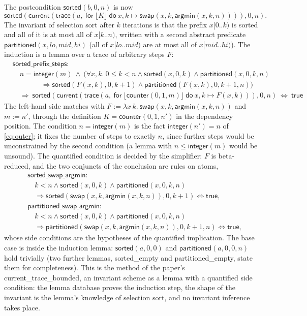 \documentclass[11pt,a4paper]{article}
\newcommand{\bl}[1]{\lfloor #1\rfloor}                       %
\newcommand{\tr}[3]{\mathsf{trace}(#1,\ \mathsf{for}\ #2\ \mathsf{do}\ #3)}
\newcommand{\cnt}{\mathsf{counter}}
\newcommand{\cur}{\mathsf{current}}
\newcommand{\intf}{\mathsf{integer}}
\newcommand{\sorted}{\mathsf{sorted}}
\newcommand{\partitioned}{\mathsf{partitioned}}
\newcommand{\argmin}{\mathsf{argmin}}
\newcommand{\swap}[3]{\mathsf{swap}(#1, #2, #3)}
\newcommand{\lemma}[1]{\textsf{#1}}
\begin{document}
The postcondition $\sorted(b, 0, n)$ is now
\[ \sorted(\cur(\tr{a}{\bl{K}}{x, k \mapsto \swap{x}{k}{\argmin(x, k, n)}}), 0, n). \]
The invariant of
selection sort after $k$ iterations is that the prefix $x[0..k)$ is sorted and all of it is at most all
of $x[k..n)$, written with a second abstract predicate $\partitioned(x, lo, mid, hi)$ (all of $x[lo..mid)$
are at most all of $x[mid..hi)$). The induction is a lemma over a trace of arbitrary steps $F$:
\begin{align*}
  &\lemma{sorted\_prefix\_steps}:\\
  &\quad  n = \intf(m)\ \wedge\
    \big(\forall x, k.\ 0 \le k < n \wedge \sorted(x, 0, k) \wedge \partitioned(x, 0, k, n) \\
  &\qquad\qquad \Longrightarrow \sorted(F(x, k), 0, k + 1) \wedge \partitioned(F(x, k), 0, k + 1, n)\big) \\
  &\quad\Longrightarrow\ \sorted(\cur(\tr{a}{\bl{\cnt(0, 1, m)}}{x, k \mapsto F(x, k)}), 0, n)\ \Longleftrightarrow\ \mathsf{true}
\end{align*}
The left-hand side matches with $F := \lambda x\, k.\ \swap{x}{k}{\argmin(x, k, n)}$ and $m := n'$,
through the definition $K = \cnt(0, 1, n')$ in the dependency position. The condition $n = \intf(m)$
is the fact $\intf(n') = n$ of \eqref{eq:outer}; it fixes the number of steps to exactly $n$, since
further steps would be unconstrained by the second condition (a lemma with $n \le \intf(m)$ would be
unsound). The quantified condition is decided by the simplifier: $F$ is beta-reduced, and the two
conjuncts of the conclusion are rules on atoms,
\begin{align*}
  &\lemma{sorted\_swap\_argmin}:\\
  &\quad k < n \wedge \sorted(x, 0, k) \wedge \partitioned(x, 0, k, n)\\
    &\quad\Longrightarrow \sorted(\swap{x}{k}{\argmin(x, k, n)}, 0, k + 1) \Longleftrightarrow \mathsf{true},\\
  &\lemma{partitioned\_swap\_argmin}:\\
  &\quad k < n \wedge \sorted(x, 0, k) \wedge \partitioned(x, 0, k, n)\\
    &\quad\Longrightarrow \partitioned(\swap{x}{k}{\argmin(x, k, n)}, 0, k + 1, n) \Longleftrightarrow \mathsf{true},
\end{align*}
whose side conditions are the hypotheses of the quantified implication. The base case is inside the
induction lemma: $\sorted(a, 0, 0)$ and $\partitioned(a, 0, 0, n)$ hold trivially (two further lemmas,
\lemma{sorted\_empty} and \lemma{partitioned\_empty}, state them for completeness). This is the method of
the paper's \lemma{current\_trace\_bounded}, an invariant scheme as a lemma with a quantified side
condition: the lemma database proves the induction step, the shape of the invariant is the lemma's
knowledge of selection sort, and no invariant inference takes place.
\end{document}
